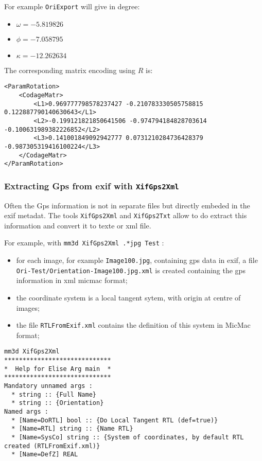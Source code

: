 For example {\tt OriExport} will give in degree:
\newline


\begin{itemize}
\item $\omega=-5.819826$  
\item $\phi=-7.058795$  
\item $\kappa=-12.262634$\newline
\end{itemize}



The corresponding matrix encoding using $R$ is:


\begin{verbatim}
<ParamRotation>
    <CodageMatr>
        <L1>0.969777798578237427 -0.210783330505758815 0.122887790140630643</L1>
        <L2>-0.199121821850641506 -0.974794184828703614 -0.100631989382226852</L2>
        <L3>0.141001849092942777 0.0731210284736428379 -0.987305319416100224</L3>
	</CodageMatr>
</ParamRotation>
\end{verbatim}

\subsubsection{Extracting Gps from exif with {\tt XifGps2Xml}}

Often the Gps information is not in separate files but directly embeded in the exif
metadat. The tools {\tt XifGps2Xml} and {\tt XifGps2Txt} allow to do extract this 
information and convert it to texte or xml file.

For example, with {\tt mm3d XifGps2Xml .*jpg Test}  :

\begin{itemize}
  \item for each  image, for example {\tt Image100.jpg},  containing gps data in exif, a file
        {\tt Ori-Test/Orientation-Image100.jpg.xml} is created containing the gps information
        in xml micmac format;
  \item the coordinate system is a local tangent sytem, with origin at centre of images;
  \item  the file {\tt RTLFromExif.xml} contains the definition of this system in MicMac format;
\end{itemize}

\begin{verbatim}
mm3d XifGps2Xml
*****************************
*  Help for Elise Arg main  *
*****************************
Mandatory unnamed args : 
  * string :: {Full Name}
  * string :: {Orientation}
Named args : 
  * [Name=DoRTL] bool :: {Do Local Tangent RTL (def=true)}
  * [Name=RTL] string :: {Name RTL}
  * [Name=SysCo] string :: {System of coordinates, by default RTL created (RTLFromExif.xml)}
  * [Name=DefZ] REAL
\end{verbatim}


